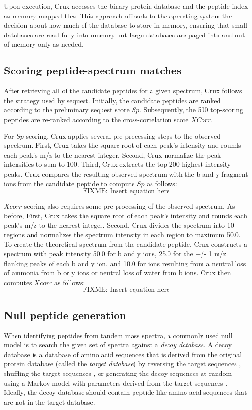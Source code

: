 \documentclass{bioinfo}
\renewcommand{\cite}{\citep}
\begin{document}
Upon execution, Crux accesses the binary protein database and the
peptide index as memory-mapped files.  This approach offloads to the
operating system the decision about how much of the database to store
in memory, ensuring that small databases are read fully into memory
but large databases are paged into and out of memory only as needed.

\subsection{Scoring peptide-spectrum matches}

After retrieving all of the candidate peptides for a given spectrum,
Crux follows the strategy used by {\sc sequest}.  Initially, the candidate
peptides are ranked according to the preliminary {\sc sequest} score $Sp$.
Subsequently, the 500 top-scoring peptides are re-ranked according to
the cross-correlation score $XCorr$.

For $Sp$ scoring, Crux applies several pre-processing steps to the
observed spectrum.  First, Crux takes the square root of each peak's
intensity and rounds each peak's m/z to the nearest integer.  Second,
Crux normalize the peak intensities to sum to 100.  Third, Crux
extracts the top 200 highest intensity peaks.  Crux compares the
resulting observed spectrum with the b and y fragment ions from the
candidate peptide to compute $Sp$ as follows:
\[
\mbox{FIXME: Insert equation here}
\]

$Xcorr$ scoring also requires some pre-processing of the observed
spectrum.  As before, First, Crux takes the square root of each peak's
intensity and rounds each peak's m/z to the nearest integer.  Second,
Crux divides the spectrum into 10 regions and normalizes the spectrum
intensity in each region to maximum 50.0. To create the theoretical
spectrum from the candidate peptide, Crux constructs a spectrum with
peak intensity 50.0 for b and y ions, 25.0 for the +/- 1 m/z flanking
peaks of each b and y ion, and 10.0 for ions resulting from a neutral
loss of ammonia from b or y ions or neutral loss of water
from b ions.  Crux then computes $Xcorr$ as follows:
\[
\mbox{FIXME: Insert equation here}
\]

\subsection{Null peptide generation}

When identifying peptides from tandem mass spectra, a commonly used
null model is to search the given set of spectra against a {\em decoy
database}.  A decoy database is a database of amino acid sequences
that is derived from the original protein database (called the {\em
target database}) by reversing the target sequences
\cite{moore:qscore}, shuffling the target sequences
\cite{klammer:effects}, or generating the decoy sequences at random
using a Markov model with parameters derived from the target sequences
\cite{colinge:olav}.  Ideally, the decoy database should contain
peptide-like amino acid sequences that are not in the target database.
\end{document}
